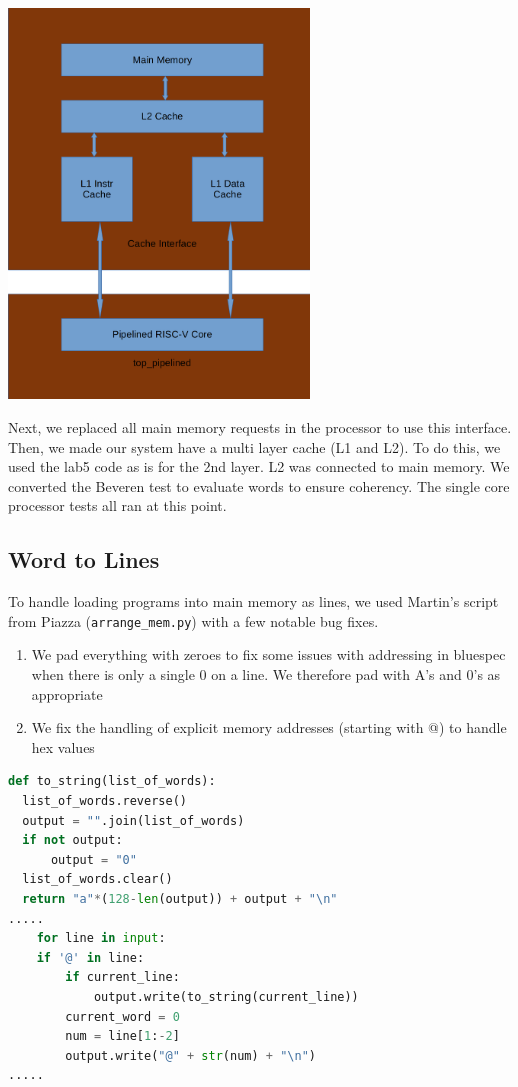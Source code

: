 \documentclass{article}
\begin{document}
\includegraphics[width=8cm]{cacheproc.png}

Next, we replaced all main memory requests in the processor to use this interface. Then, we made our system have a multi layer cache (L1 and L2). To do this, we used the lab5 code as is for the 2nd layer. L2 was connected to main memory. We converted the Beveren test to evaluate words to ensure coherency. The single core processor tests all ran at this point.

\subsection{Word to Lines}

To handle loading programs into main memory as lines, we used Martin's script from Piazza (\lstinline|arrange_mem.py|) with a few notable bug fixes.
\begin{enumerate}[(1)]
  \item We pad everything with zeroes to fix some issues with addressing in bluespec when there is only a single 0 on a line. We therefore pad with A's and 0's as appropriate
  \item We fix the handling of explicit memory addresses (starting with @) to handle hex values 
\end{enumerate}

\begin{lstlisting}[language=Python]
def to_string(list_of_words):
  list_of_words.reverse()
  output = "".join(list_of_words)
  if not output:
      output = "0"
  list_of_words.clear()
  return "a"*(128-len(output)) + output + "\n"
.....
    for line in input:
    if '@' in line:
        if current_line:
            output.write(to_string(current_line))
        current_word = 0
        num = line[1:-2]
        output.write("@" + str(num) + "\n")
.....
\end{lstlisting}
\end{document}
